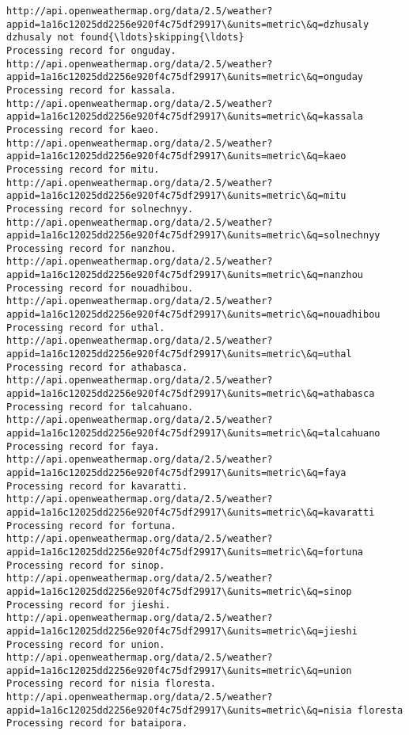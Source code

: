 \documentclass[11pt]{article}
\begin{document}
\begin{Verbatim}[commandchars=\\\{\}]
http://api.openweathermap.org/data/2.5/weather?appid=1a16c12025dd2256e920f4c75df29917\&units=metric\&q=dzhusaly
dzhusaly not found{\ldots}skipping{\ldots}
Processing record for onguday.
http://api.openweathermap.org/data/2.5/weather?appid=1a16c12025dd2256e920f4c75df29917\&units=metric\&q=onguday
Processing record for kassala.
http://api.openweathermap.org/data/2.5/weather?appid=1a16c12025dd2256e920f4c75df29917\&units=metric\&q=kassala
Processing record for kaeo.
http://api.openweathermap.org/data/2.5/weather?appid=1a16c12025dd2256e920f4c75df29917\&units=metric\&q=kaeo
Processing record for mitu.
http://api.openweathermap.org/data/2.5/weather?appid=1a16c12025dd2256e920f4c75df29917\&units=metric\&q=mitu
Processing record for solnechnyy.
http://api.openweathermap.org/data/2.5/weather?appid=1a16c12025dd2256e920f4c75df29917\&units=metric\&q=solnechnyy
Processing record for nanzhou.
http://api.openweathermap.org/data/2.5/weather?appid=1a16c12025dd2256e920f4c75df29917\&units=metric\&q=nanzhou
Processing record for nouadhibou.
http://api.openweathermap.org/data/2.5/weather?appid=1a16c12025dd2256e920f4c75df29917\&units=metric\&q=nouadhibou
Processing record for uthal.
http://api.openweathermap.org/data/2.5/weather?appid=1a16c12025dd2256e920f4c75df29917\&units=metric\&q=uthal
Processing record for athabasca.
http://api.openweathermap.org/data/2.5/weather?appid=1a16c12025dd2256e920f4c75df29917\&units=metric\&q=athabasca
Processing record for talcahuano.
http://api.openweathermap.org/data/2.5/weather?appid=1a16c12025dd2256e920f4c75df29917\&units=metric\&q=talcahuano
Processing record for faya.
http://api.openweathermap.org/data/2.5/weather?appid=1a16c12025dd2256e920f4c75df29917\&units=metric\&q=faya
Processing record for kavaratti.
http://api.openweathermap.org/data/2.5/weather?appid=1a16c12025dd2256e920f4c75df29917\&units=metric\&q=kavaratti
Processing record for fortuna.
http://api.openweathermap.org/data/2.5/weather?appid=1a16c12025dd2256e920f4c75df29917\&units=metric\&q=fortuna
Processing record for sinop.
http://api.openweathermap.org/data/2.5/weather?appid=1a16c12025dd2256e920f4c75df29917\&units=metric\&q=sinop
Processing record for jieshi.
http://api.openweathermap.org/data/2.5/weather?appid=1a16c12025dd2256e920f4c75df29917\&units=metric\&q=jieshi
Processing record for union.
http://api.openweathermap.org/data/2.5/weather?appid=1a16c12025dd2256e920f4c75df29917\&units=metric\&q=union
Processing record for nisia floresta.
http://api.openweathermap.org/data/2.5/weather?appid=1a16c12025dd2256e920f4c75df29917\&units=metric\&q=nisia floresta
Processing record for bataipora.

\end{Verbatim}
\end{document}
